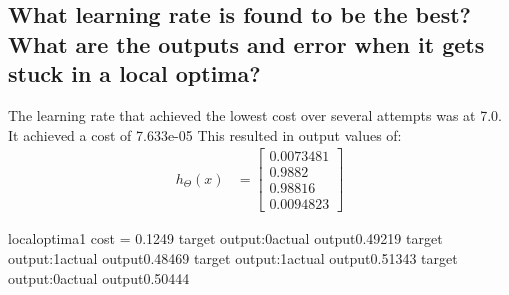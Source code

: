 \documentclass[titlepage]{scrartcl}
\begin{document}
\subsection{What learning rate is found to be the best? What are the outputs
and error when it gets stuck in a local optima?}
The learning rate that achieved the lowest cost over several attempts was at
7.0. It achieved a cost of 7.633e-05
This resulted in output values of:
\begin{align}
h_\Theta(x) &= \begin{bmatrix}
           0.0073481 \\
           0.9882 \\
           0.98816 \\
           0.0094823
         \end{bmatrix}
\end{align}





localoptima1
cost = 0.1249
target output:0actual output0.49219
target output:1actual output0.48469
target output:1actual output0.51343
target output:0actual output0.50444

\end{document}
